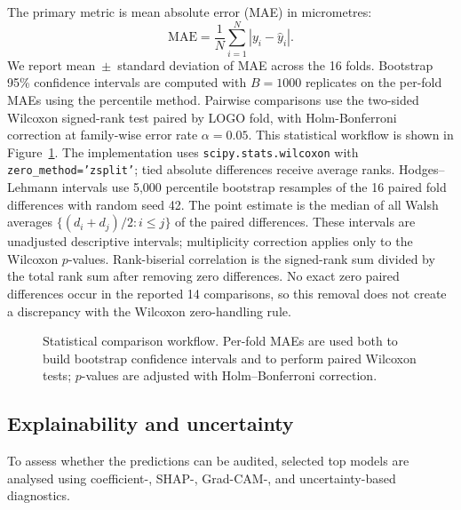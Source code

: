 The primary metric is mean absolute error (MAE) in micrometres:
\begin{equation}
\mathrm{MAE} = \frac{1}{N}\sum_{i=1}^{N} |y_i - \hat{y}_i|.
\label{eq:mae}
\end{equation}
We report mean~$\pm$~standard deviation of MAE across the 16 folds.
Bootstrap 95\% confidence intervals are computed with $B=1000$
replicates on the per-fold MAEs using the percentile method. Pairwise
comparisons use the two-sided Wilcoxon signed-rank test paired by LOGO
fold, with Holm-Bonferroni correction at family-wise error rate
$\alpha=0.05$. This statistical workflow is shown in
Figure~\ref{fig:statistical-workflow}.
The implementation uses \texttt{scipy.stats.wilcoxon} with
\texttt{zero\_method='zsplit'}; tied absolute differences receive average
ranks. Hodges--Lehmann intervals use 5,000 percentile bootstrap resamples
of the 16 paired fold differences with random seed 42. The point estimate
is the median of all Walsh averages $\{(d_i+d_j)/2:i\leq j\}$ of the
paired differences. These intervals are unadjusted descriptive intervals;
multiplicity correction applies only to the Wilcoxon $p$-values. Rank-biserial
correlation is the signed-rank sum divided by the total rank sum after
removing zero differences. No exact zero paired differences occur in the
reported 14 comparisons, so this removal does not create a discrepancy with
the Wilcoxon zero-handling rule.

\begin{figure}[htbp]
\centering
\resizebox{0.5\linewidth}{!}{}
\caption{Statistical comparison workflow. Per-fold MAEs are used both to
build bootstrap confidence intervals and to perform paired Wilcoxon tests;
$p$-values are adjusted with Holm--Bonferroni correction.}
\label{fig:statistical-workflow}
\end{figure}

\subsection{Explainability and uncertainty}\label{explainability-and-uncertainty}

To assess whether the predictions can be audited, selected top models
are analysed using coefficient-, SHAP-, Grad-CAM-, and uncertainty-based
diagnostics.

